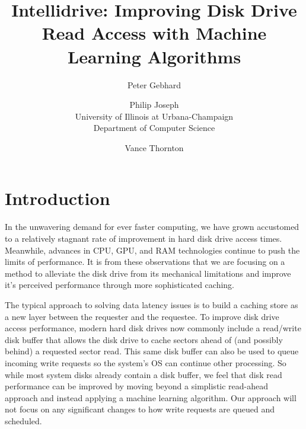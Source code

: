 \documentclass[letterpaper,twocolumn,10pt]{article}
\begin{document}
\date{}

\title{\Large \bf Intellidrive: Improving Disk Drive Read Access with Machine \\ Learning Algorithms}

\author{
{\rm Peter Gebhard}\\
\and
{\rm Philip Joseph}\\
University of Illinois at Urbana-Champaign \\
Department of Computer Science
\and
{\rm Vance Thornton}\\
} %

\maketitle

\thispagestyle{empty}

\section{Introduction}

In the unwavering demand for ever faster computing, we have grown accustomed to a relatively stagnant rate of improvement in hard disk drive access times.  Meanwhile, advances in CPU, GPU, and RAM technologies continue to push the limits of performance.  It is from these observations that we are focusing on a method to alleviate the disk drive from its mechanical limitations and improve it's perceived performance through more sophisticated caching.

The typical approach to solving data latency issues is to build a caching store as a new layer between the requester and the requestee.  To improve disk drive access performance, modern hard disk drives now commonly include a read/write disk buffer that allows the disk drive to cache sectors ahead of (and possibly behind) a requested sector read.  This same disk buffer can also be used to queue incoming write requests so the system's OS can continue other processing.  So while most system disks already contain a disk buffer, we feel that disk read performance can be improved by moving beyond a simplistic read-ahead approach and instead applying a machine learning algorithm.  Our approach will not focus on any significant changes to how write requests are queued and scheduled.
\end{document}
